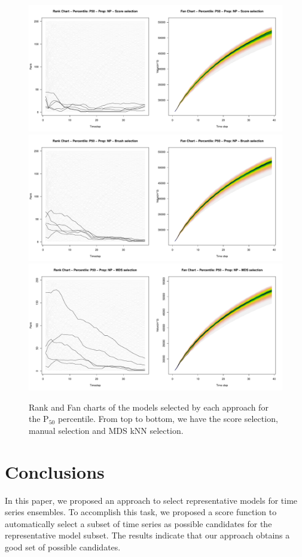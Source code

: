 \documentclass{sigchi-ext}
\begin{document}
\begin{figure}
  \centering
  \includegraphics[width=\columnwidth]{rank-fan-score-p50.pdf}
  \includegraphics[width=\columnwidth]{rank-fan-brush-p50.pdf}
  \includegraphics[width=\columnwidth]{rank-fan-mds-sel-p50.pdf}
  \caption{Rank and Fan charts of the models selected by each approach for the P$_{50}$ percentile. From top to bottom, we have the score selection, manual selection and MDS kNN selection.}
  \label{fig:models-p50}
\end{figure}

\section{Conclusions}
\label{sec:conclusion}
In this paper, we proposed an approach to select representative models for time series ensembles. To accomplish this task, we proposed a score function to automatically select a subset of time series as possible candidates for the representative model subset. The results indicate that our approach obtains a good set of possible candidates.
\end{document}
